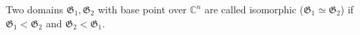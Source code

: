 Two domains $\mathfrak{G}_1, \mathfrak{G}_2$ with base point over $\mathbb{C}^n$ are called isomorphic ($\mathfrak{G}_1 \simeq \mathfrak{G}_2$) if $\mathfrak{G}_1 < \mathfrak{G}_2$ and $\mathfrak{G}_2 < \mathfrak{G}_1$.
